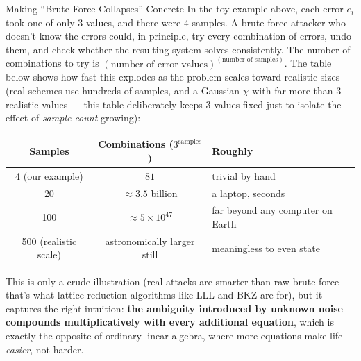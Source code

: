\begin{rmkbox}{Making ``Brute Force Collapses'' Concrete}
In the toy example above, each error $e_i$ took one of only $3$ values, and there were $4$ samples. A brute-force attacker who doesn't know the errors could, in principle, try every combination of errors, undo them, and check whether the resulting system solves consistently. The number of combinations to try is $(\text{number of error values})^{(\text{number of samples})}$. The table below shows how fast this explodes as the problem scales toward realistic sizes (real schemes use hundreds of samples, and a Gaussian $\chi$ with far more than $3$ realistic values --- this table deliberately keeps $3$ values fixed just to isolate the effect of \emph{sample count} growing):
\begin{center}
\begin{tabular}{|c|c|l|}
\hline
Samples & Combinations ($3^{\text{samples}}$) & Roughly \\
\hline
4 (our example) & $81$ & trivial by hand \\
20 & $\approx 3.5$ billion & a laptop, seconds \\
100 & $\approx 5\times 10^{47}$ & far beyond any computer on Earth \\
500 (realistic scale) & astronomically larger still & meaningless to even state \\
\hline
\end{tabular}
\end{center}
This is only a crude illustration (real attacks are smarter than raw brute force --- that's what lattice-reduction algorithms like LLL and BKZ are for), but it captures the right intuition: \textbf{the ambiguity introduced by unknown noise compounds multiplicatively with every additional equation}, which is exactly the opposite of ordinary linear algebra, where more equations make life \emph{easier}, not harder.
\end{rmkbox}

